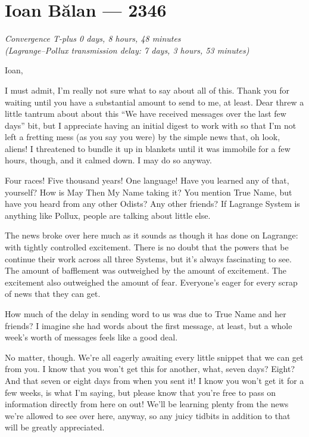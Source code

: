\hypertarget{ioan-bux103lan-2346}{%
\chapter{Ioan Bălan — 2346}\label{ioan-bux103lan-2346}}

\begin{center}
\emph{Convergence T-plus 0 days, 8 hours, 48 minutes}\\
\emph{(Lagrange--Pollux transmission delay: 7 days, 3 hours, 53 minutes)}
\end{center}

\noindent Ioan,

I must admit, I'm really not sure what to say about all of this. Thank you for waiting until you have a substantial amount to send to me, at least. Dear threw a little tantrum about about this ``We have received messages over the last few days'' bit, but I appreciate having an initial digest to work with so that I'm not left a fretting mess (as you say you were) by the simple news that, oh look, aliens! I threatened to bundle it up in blankets until it was immobile for a few hours, though, and it calmed down. I may do so anyway.

Four races! Five thousand years! One language! Have you learned any of that, yourself? How is May Then My Name taking it? You mention True Name, but have you heard from any other Odists? Any other friends? If Lagrange System is anything like Pollux, people are talking about little else.

The news broke over here much as it sounds as though it has done on Lagrange: with tightly controlled excitement. There is no doubt that the powers that be continue their work across all three Systems, but it's always fascinating to see. The amount of bafflement was outweighed by the amount of excitement. The excitement also outweighed the amount of fear. Everyone's eager for every scrap of news that they can get.

How much of the delay in sending word to us was due to True Name and her friends? I imagine she had words about the first message, at least, but a whole week's worth of messages feels like a good deal.

No matter, though. We're all eagerly awaiting every little snippet that we can get from you. I know that you won't get this for another, what, seven days? Eight? And that seven or eight days from when you sent it! I know you won't get it for a few weeks, is what I'm saying, but please know that you're free to pass on information directly from here on out! We'll be learning plenty from the news we're allowed to see over here, anyway, so any juicy tidbits in addition to that will be greatly appreciated.

